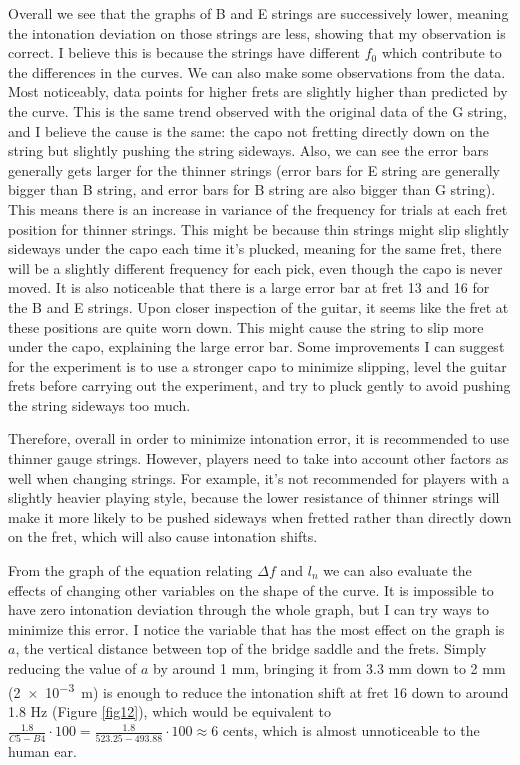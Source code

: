 Overall we see that the graphs of B and E strings are successively lower, meaning the intonation deviation on those strings are less, showing that my observation is correct. I believe this is because the strings have different $f_0$ which contribute to the differences in the curves. We can also make some observations from the data. Most noticeably, data points for higher frets are slightly higher than predicted by the curve. This is the same trend observed with the original data of the G string, and I believe the cause is the same: the capo not fretting directly down on the string but slightly pushing the string sideways. Also, we can see the error bars generally gets larger for the thinner strings (error bars for E string are generally bigger than B string, and error bars for B string are also bigger than G string). This means there is an increase in variance of the frequency for trials at each fret position for thinner strings. This might be because thin strings might slip slightly sideways under the capo each time it's plucked, meaning for the same fret, there will be a slightly different frequency for each pick, even though the capo is never moved. It is also noticeable that there is a large error bar at fret 13 and 16 for the B and E strings. Upon closer inspection of the guitar, it seems like the fret at these positions are quite worn down. This might cause the string to slip more under the capo, explaining the large error bar. Some improvements I can suggest for the experiment is to use a stronger capo to minimize slipping, level the guitar frets before carrying out the experiment, and try to pluck gently to avoid pushing the string sideways too much.

Therefore, overall in order to minimize intonation error, it is recommended to use thinner gauge strings. However, players need to take into account other factors as well when changing strings. For example, it's not recommended for players with a slightly heavier playing style, because the lower resistance of thinner strings will make it more likely to be pushed sideways when fretted rather than directly down on the fret, which will also cause intonation shifts.\par

From the graph of the equation relating $\Delta f$ and $l_n$ we can also evaluate the effects of changing other variables on the shape of the curve. It is impossible to have zero intonation deviation through the whole graph, but I can try ways to minimize this error. I notice the variable that has the most effect on the graph is $a$, the vertical distance between top of the bridge saddle and the frets. Simply reducing the value of $a$ by around 1 mm, bringing it from 3.3 mm down to 2 mm (\SI{2e-3}{m}) is enough to reduce the intonation shift at fret 16 down to around 1.8 Hz (Figure \ref{fig12}), which would be equivalent to $\frac{1.8}{C5-B4}\cdot 100 = \frac{1.8}{523.25-493.88} \cdot 100 \approx 6$ cents, which is almost unnoticeable to the human ear. \cite{loeffler}

